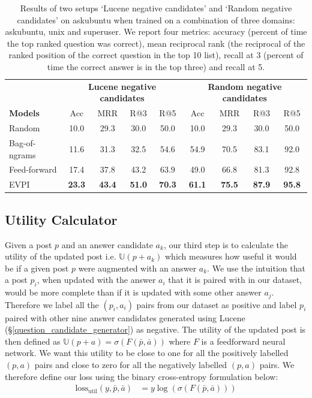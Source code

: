 \documentclass[11pt,a4paper]{article}
\newcommand{\U}{\mathbb{U}}
\begin{document}
\begin{table}[t]
	\small
	\centering
	\begin{tabular}{l|cccc|cccc}
		\toprule
		& \multicolumn{4}{c|}{\textbf{Lucene negative candidates}} & \multicolumn{4}{c}{\textbf{Random negative candidates}} \\
		\textbf{Models} & Acc & MRR & R@3 & R@5 & Acc & MRR & R@3 & R@5\\
		\midrule
		Random  & 10.0 & 29.3 & 30.0 & 50.0 &10.0 & 29.3 & 30.0 & 50.0 \\
		Bag-of-ngrams & 11.6 & 31.3 & 32.5 & 54.6 & 54.9 & 70.5 & 83.1 & 92.0 \\
		Feed-forward & 17.4 & 37.8 & 43.2 & 63.9 &  49.0 & 66.8 & 81.3 & 92.8 \\
		EVPI & \bf 23.3 & \bf 43.4 & \bf 51.0 & \bf 70.3 & \bf 61.1 & \bf 75.5 & \bf 87.9  & \bf 95.8  \\
		\bottomrule
	\end{tabular}
	\caption{Results of two setups `Lucene negative candidates' and `Random negative candidates' on askubuntu when trained on a combination of three domains: askubuntu, unix and superuser.  We report four metrics: accuracy (percent of time the top ranked question was correct),
		mean reciprocal rank (the reciprocal of the ranked position of the correct question in the top 10 list), recall at 3 (percent of time the correct answer is in the top three) and
		recall at 5.}
	\label{tab:results_topN}
	\vspace{-1.0em}
\end{table}

\subsection{Utility Calculator}\label{utility_calculator}
Given a post $p$ and an answer candidate $a_k$, our third step is to calculate the utility of the updated post i.e. $\U(p + a_k)$ which measures how useful it would be if a given post $p$ were augmented with an answer $a_k$. We use the intuition that a post $p_i$, when updated with the answer $a_i$ that it is paired with in our dataset, would be more complete than if it is updated with some other answer $a_j$. Therefore we label all the $(p_i, a_i)$ pairs from our dataset as positive and label $p_i$ paired with other nine answer candidates generated using Lucene (\S\ref{question_candidate_generator}) as negative.  The utility of the updated post is then defined as $\U(p+a) = \sigma ( F(\bar{p}, \bar{a}) )$ where $F$ is a feedforward neural network. We want this utility to be close to one for all the positively labelled $(p,a)$ pairs and close to zero for all the negatively labelled $(p, a)$ pairs. We therefore define our loss using the binary cross-entropy formulation below:
\begin{align}\label{eq_utility_calculator}
\textrm{loss}_{\textrm{util}}(y, \bar p, \bar a) &= y \log(\sigma (F(\bar{p}, \bar{a})))
\end{align}
\end{document}
